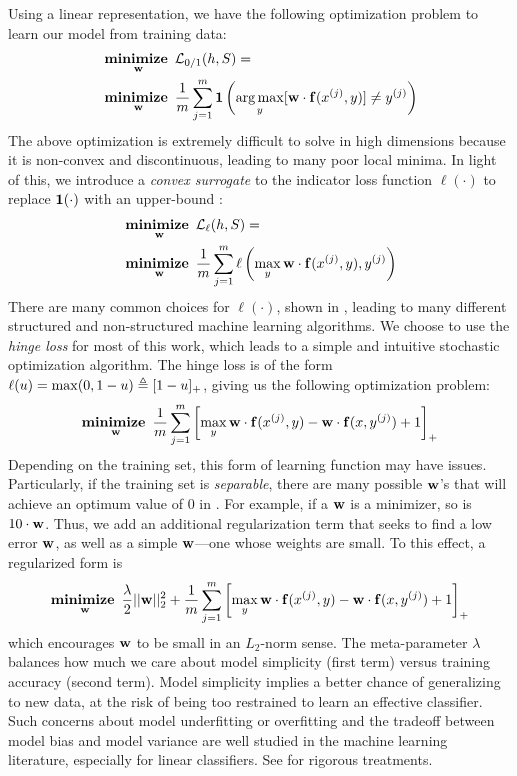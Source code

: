 Using a linear representation, we have the following optimization problem to learn our model from training data:
\begin{align}
&\mathop{\mathbf{minimize~}}_{\mathbf{w}} \mathcal{L}_{0/1}(h,S) = \\ &\mathop{\mathbf{minimize~}}_{\mathbf{w}} \frac{1}{m}\sum_{j=1}^m 
\mathbf{1}\left( \mathop{\arg\max}_y [\mathbf{w} \cdot \mathbf{f}(x^{(j)},y)] \neq y^{(j)}\right)
\end{align}
The above optimization is extremely difficult to solve in high dimensions 
because it is non-convex and discontinuous, leading to many poor local minima.  
In light of this, we introduce a {\em convex surrogate} to the indicator loss 
function $\ell(\cdot)$ to replace $\mathbf{1}(\cdot)$ with an upper-bound 
\citep{bishop-book}:
\begin{align}
&\mathop{\mathbf{minimize~}}_{\mathbf{w}} \mathcal{L}_{\ell}(h,S) = \\ &\mathop{\mathbf{minimize~}}_{\mathbf{w}} \frac{1}{m}\sum_{j=1}^m 
\ell\left( \max_y \mathbf{w} \cdot \mathbf{f}(x^{(j)},y), y^{(j)}\right)
\label{eq:convex-loss}
\end{align}
There are many common choices for $\ell(\cdot)$, shown in , 
leading to many different structured and non-structured machine learning 
algorithms.  We choose to use the {\em hinge loss} for most of this work, which 
leads to a simple and intuitive stochastic optimization algorithm.  The hinge 
loss is of the form $\ell(u) = \max (0,1-u) \triangleq [1-u]_+$, giving us the 
following optimization problem:
\begin{align}
\mathop{\mathbf{minimize~}}_{\mathbf{w}} \frac{1}{m}\sum_{j=1}^m \left[ \max_y \mathbf{w} \cdot \mathbf{f}(x^{(j)},y) - \mathbf{w} 
\cdot \mathbf{f}(x,y^{(j)}) + 1\right]_+
\label{eq:svm-noreg}
\end{align}
Depending on the training set, this form of learning function may have issues.  
Particularly, if the training set is {\em separable}, there are many possible 
$\mathbf{w}$'s that will achieve an optimum value of $0$ in . For 
example, if a $\mathbf{w}$ is a minimizer, so is $10\cdot \mathbf{w}$.  Thus, we add an 
additional regularization term that seeks to find a low error $\mathbf{w}$, as well as 
a simple $\mathbf{w}$---one whose weights are small. To this effect, a regularized form 
is
\begin{align}
\mathop{\mathbf{minimize~}}_{\mathbf{w}} \frac{\lambda}{2}||\mathbf{w}||_2^2 + \frac{1}{m}\sum_{j=1}^m \left[ 
\max_y \mathbf{w} \cdot \mathbf{f}(x^{(j)},y) - \mathbf{w} \cdot \mathbf{f}(x,y^{(j)}) + 1\right]_+
\label{eq:svm}
\end{align}
 which encourages $\mathbf{w}$ to be small in an $L_2$-norm sense.  The meta-parameter 
$\lambda$ balances how much we care about model simplicity (first term) versus 
training accuracy (second term).  Model simplicity implies a better chance of 
generalizing to new data, at the risk of being too restrained to learn an 
effective classifier.  Such concerns about model underfitting or overfitting 
and the tradeoff between model bias and model variance are well studied in the 
machine learning literature, especially for linear classifiers. See 
\citet{bishop-book, esl-book} for rigorous treatments.

